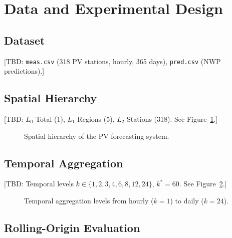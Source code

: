 \section{Data and Experimental Design}\label{sec:data-design}

\subsection{Dataset}\label{sec:dataset}

[TBD: \texttt{meas.csv} (318 PV stations, hourly, 365 days), \texttt{pred.csv} (NWP predictions).]

\subsection{Spatial Hierarchy}\label{sec:spatial-hierarchy}

[TBD: $L_0$ Total (1), $L_1$ Regions (5), $L_2$ Stations (318). See Figure~\ref{fig:spatial-hierarchy}.]

\begin{figure}[htbp]
    \centering
    \caption{Spatial hierarchy of the PV forecasting system.}
    \label{fig:spatial-hierarchy}
\end{figure}

\subsection{Temporal Aggregation}\label{sec:temporal-aggregation}

[TBD: Temporal levels $k \in \{1,2,3,4,6,8,12,24\}$, $k^*=60$. See Figure~\ref{fig:temporal-hierarchy}.]

\begin{figure}[htbp]
    \centering
    \caption{Temporal aggregation levels from hourly ($k=1$) to daily ($k=24$).}
    \label{fig:temporal-hierarchy}
\end{figure}

\subsection{Rolling-Origin Evaluation}\label{sec:rolling-origin}

